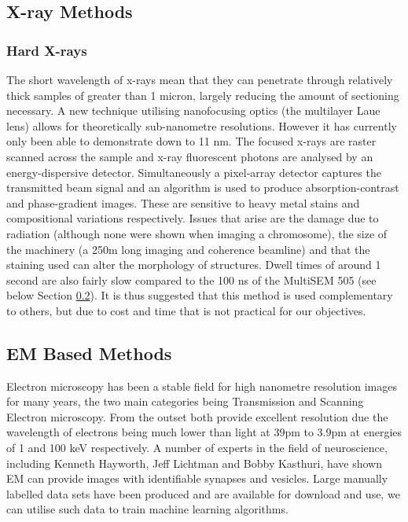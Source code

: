 \documentclass[a4paper, 11pt]{article}
\numberwithin{equation}{section}
\begin{document}
\subsection{X-ray Methods}
\subsubsection{Hard X-rays}

The short wavelength of x-rays mean that they can penetrate through relatively thick samples of greater than 1 micron, largely reducing the amount of sectioning necessary. A new technique utilising nanofocusing optics (the multilayer Laue lens) allows for theoretically sub-nanometre resolutions. However it has currently only been able to demonstrate down to 11 nm. The focused x-rays are raster scanned across the sample and x-ray fluorescent photons are analysed by an energy-dispersive detector. Simultaneously a pixel-array detector captures the transmitted beam signal and an algorithm is used to produce absorption-contrast and phase-gradient images. These are sensitive to heavy metal stains and compositional variations respectively\cite{yan2016multimodality}. Issues that arise are the damage due to radiation (although none were shown when imaging a chromosome), the size of the machinery (a 250m long imaging and coherence beamline) and that the staining used can alter the morphology of structures. Dwell times of around 1 second are also fairly slow compared to the 100 ns of the MultiSEM 505 (see below Section \ref{EMChemRef}). It is thus suggested that this method is used complementary to others, but due to cost and time that is not practical for our objectives.



\subsection{EM Based Methods}
\label{EMChemRef}

Electron microscopy has been a stable field for high nanometre resolution images for many years, the two main categories being Transmission and Scanning Electron microscopy.  From the outset both provide excellent resolution due the wavelength of electrons being much lower than light at 39pm to 3.9pm at energies of 1 and 100 keV respectively\cite{denk2012structural}. A number of experts in the field of neuroscience, including  Kenneth Hayworth, Jeff Lichtman and Bobby Kasthuri, have shown EM can provide images with identifiable synapses and vesicles. Large manually labelled data sets have been produced and are available for download and use, we can utilise such data to train machine learning algorithms.  
\end{document}
